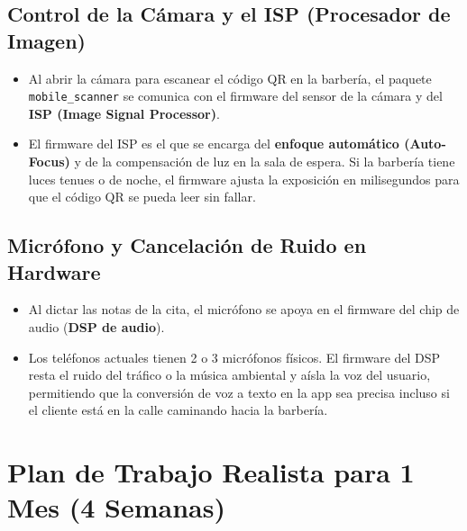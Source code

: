 \documentclass[11pt,a4paper]{article}
\begin{document}
\subsection{Control de la Cámara y el ISP (Procesador de Imagen)}

\begin{itemize}
    \item Al abrir la cámara para escanear el código QR en la barbería, el paquete \texttt{mobile\_scanner} se comunica con el firmware del sensor de la cámara y del \textbf{ISP (Image Signal Processor)}.
    \item El firmware del ISP es el que se encarga del \textbf{enfoque automático (Auto-Focus)} y de la compensación de luz en la sala de espera. Si la barbería tiene luces tenues o de noche, el firmware ajusta la exposición en milisegundos para que el código QR se pueda leer sin fallar.
\end{itemize}

\subsection{Micrófono y Cancelación de Ruido en Hardware}

\begin{itemize}
    \item Al dictar las notas de la cita, el micrófono se apoya en el firmware del chip de audio (\textbf{DSP de audio}).
    \item Los teléfonos actuales tienen 2 o 3 micrófonos físicos. El firmware del DSP resta el ruido del tráfico o la música ambiental y aísla la voz del usuario, permitiendo que la conversión de voz a texto en la app sea precisa incluso si el cliente está en la calle caminando hacia la barbería.
\end{itemize}

\newpage
\section{Plan de Trabajo Realista para 1 Mes (4 Semanas)}
\end{document}

